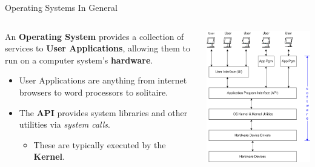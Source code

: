 \documentclass[11pt]{beamer}
\begin{document}
\begin{frame}{Operating Systems In General}
\begin{columns}
\begin{column}{.5\textwidth}
An \textbf{Operating System} provides a collection of services to \textbf{User Applications}, allowing them to run on a computer system's \textbf{hardware}.  
\begin{itemize}
\item User Applications are anything from internet browsers to word processors to solitaire.
\item The \textbf{API} provides system libraries and other utilities via \emph{system calls}.
\begin{itemize}
\item These are typically executed by the \textbf{Kernel}. 
\end{itemize}
\end{itemize}
\end{column}
\begin{column}{.5\textwidth}
\includegraphics[scale=0.3]{op_sys_block_diagram.png}
\end{column}
\end{columns}
\end{frame}
\end{document}
